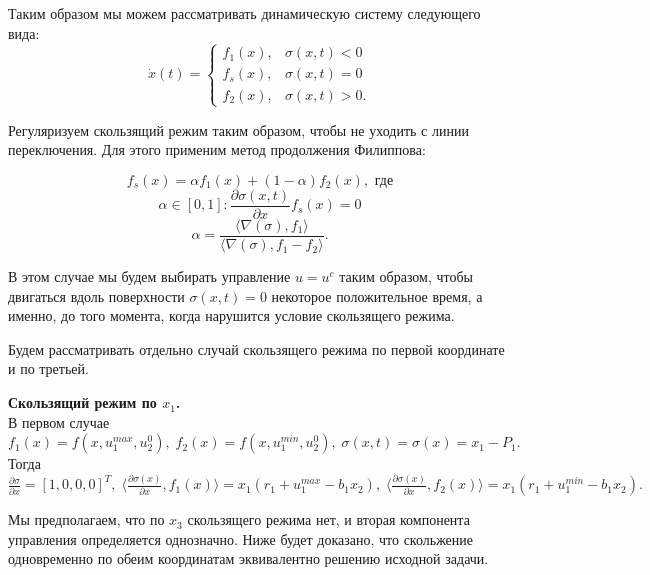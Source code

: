 \documentclass[11pt]{article}
\newcommand\dd[2]{\frac{\partial#1}{\partial#2}}
\begin{document}
Таким образом мы можем рассматривать динамическую систему следующего вида:
$$\dot x(t) = \begin{cases} f_1(x), & \sigma(x,t) < 0 \\ f_s(x), & \sigma(x,t) = 0 \\ f_2(x), & \sigma(x,t) > 0.\end{cases}$$

Регуляризуем скользящий режим таким образом, чтобы не уходить с линии переключения. Для этого применим метод продолжения Филиппова:

$$f_s(x) = \alpha f_1(x) + (1 - \alpha) f_2(x), \text{  где}$$
$$\alpha \in [0, 1] : \dd{\sigma(x,t)}{x} f_s(x) = 0$$
$$\alpha = \frac{\langle \nabla(\sigma), f_1\rangle}{\langle \nabla(\sigma), f_1 - f_2 \rangle}.$$

В этом случае мы будем выбирать управление $u = u^c$ таким образом, чтобы двигаться вдоль поверхности $\sigma(x,t) = 0$ некоторое положительное время, а именно, до того момента, когда нарушится условие скользящего режима.

Будем рассматривать отдельно случай скользящего режима по первой координате и по третьей.

{\bf Скользящий режим по $x_1$.}\\

В первом случае 
$f_1(x) = f(x,u_1^{max}, u_2^0), \; f_2(x) = f(x,u_1^{min}, u_2^0), \; \sigma(x,t) = \sigma(x) = x_1 - P_1.$
Тогда $\dd{\sigma}{x} = [1,0,0,0]^T, \; \langle \dd{\sigma(x)}{x}, f_1(x) \rangle = x_1(r_1 + u_1^{max}  - b_1x_2), \; \langle \dd{\sigma(x)}{x}, f_2(x) \rangle = x_1(r_1 + u_1^{min}  - b_1x_2).$

Мы предполагаем, что по $x_3$ скользящего режима нет, и вторая компонента управления определяется однозначно. Ниже будет доказано, что скольжение одновременно по обеим координатам эквивалентно решению исходной задачи.
\end{document}
